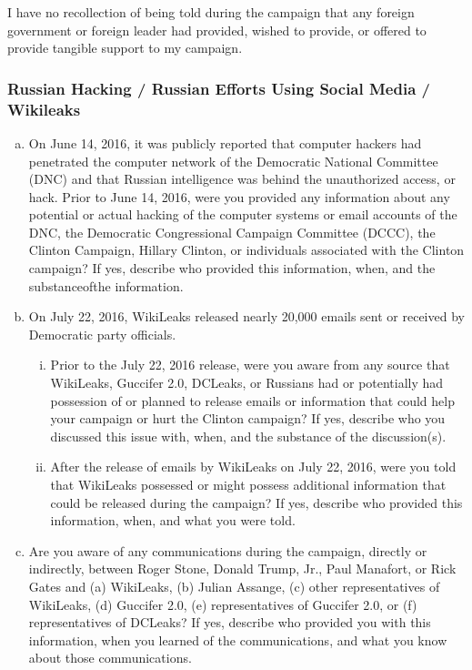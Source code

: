 I have no recollection of being told during the campaign that any foreign government or foreign leader had provided, wished to provide, or offered to provide tangible support to my campaign.

\subsubsection{Russian Hacking / Russian Efforts Using Social Media / Wikileaks}

\begin{enumerate}[a.]

\item On June 14, 2016, it was publicly reported that computer hackers had penetrated the computer network of the Democratic National Committee (DNC) and that Russian intelligence was behind the unauthorized access, or hack.
Prior to June 14, 2016, were you provided any information about any potential or actual hacking of the computer systems or email accounts of the DNC, the Democratic Congressional Campaign Committee (DCCC), the Clinton Campaign, Hillary Clinton, or individuals associated with the Clinton campaign?
If yes, describe who provided this information, when, and the substanceofthe information.

\item On July 22, 2016, WikiLeaks released nearly 20,000 emails sent or received by Democratic party officials.

\begin{enumerate}[i.]

\item Prior to the July 22, 2016 release, were you aware from any source that WikiLeaks, Guccifer 2.0, DCLeaks, or Russians had or potentially had possession of or planned to release emails or information that could help your campaign or hurt the Clinton campaign?
If yes, describe who you discussed this issue with, when, and the substance of the discussion(s).

\item After the release of emails by WikiLeaks on July 22, 2016, were you told that WikiLeaks possessed or might possess additional information that could be released during the campaign?
If yes, describe who provided this information, when, and what you were told.

\end{enumerate}

\item Are you aware of any communications during the campaign, directly or indirectly, between Roger Stone, Donald Trump, Jr., Paul Manafort, or Rick Gates and (a) WikiLeaks, (b) Julian Assange, (c) other representatives of WikiLeaks, (d) Guccifer 2.0, (e) representatives of Guccifer 2.0, or (f) representatives of DCLeaks?
If yes, describe who provided you with this information, when you learned of the communications, and what you know about those communications.


\end{enumerate}

